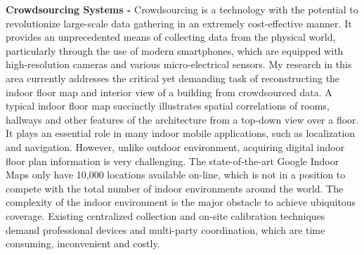 \documentclass[11pt]{article}
\begin{document}
\textbf{Crowdsourcing Systems -} Crowdsourcing is a technology with the potential to revolutionize large-scale data gathering in an extremely cost-effective manner. It provides an unprecedented means of collecting data from the physical world, particularly through the use of modern smartphones, which are equipped with high-resolution cameras and various micro-electrical sensors. My research in this area currently addresses the critical yet demanding task of reconstructing the indoor floor map and interior view of a building from crowdsourced data. A typical indoor floor map succinctly illustrates spatial correlations of rooms, hallways and other features of the architecture from a top-down view over a floor. It plays an essential role in many indoor mobile applications, such as localization and navigation. However, unlike outdoor environment, acquiring digital indoor floor plan information is very challenging. The state-of-the-art Google Indoor Maps only have 10,000 locations available on-line, which is not in a position to compete with the total number of indoor environments around the world. The complexity of the indoor environment is the major obstacle to achieve ubiquitous coverage. Existing centralized collection and on-site calibration techniques demand professional devices and multi-party coordination, which are time consuming, inconvenient and costly. 
\end{document}
